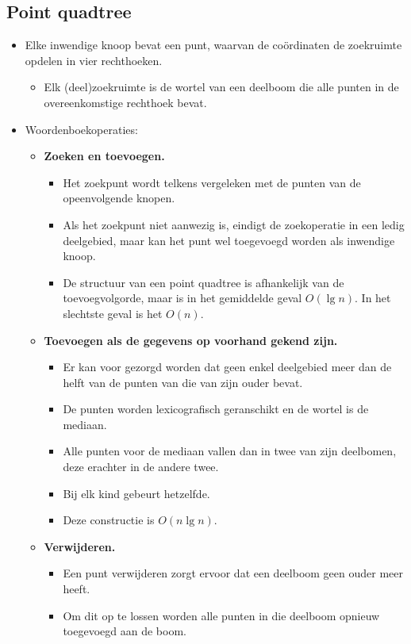 \subsection{Point quadtree}
\begin{itemize}
    \item Elke inwendige knoop bevat een punt, waarvan de coördinaten de zoekruimte opdelen in vier rechthoeken.
    \begin{itemize}
        \item Elk (deel)zoekruimte is de wortel van een deelboom die alle punten in de overeenkomstige rechthoek bevat.
    \end{itemize}
    \item Woordenboekoperaties:
    \begin{itemize}
        \item \textbf{Zoeken en toevoegen.}
        \begin{itemize}
            \item Het zoekpunt wordt telkens vergeleken met de punten van de opeenvolgende knopen.
            \item Als het zoekpunt niet aanwezig is, eindigt de zoekoperatie in een ledig deelgebied, maar kan het punt wel toegevoegd worden als inwendige knoop.
            \item De structuur van een point quadtree is afhankelijk van de toevoegvolgorde, maar is in het gemiddelde geval $O(\lg n)$. In het slechtste geval is het $O(n)$.
        \end{itemize}
        \item \textbf{Toevoegen als de gegevens op voorhand gekend zijn.}
        \begin{itemize}
            \item Er kan voor gezorgd worden dat geen enkel deelgebied meer dan de helft van de punten van die van zijn ouder bevat.
            \item De punten worden lexicografisch geranschikt en de wortel is de mediaan.
            \item Alle punten voor de mediaan vallen dan in twee van zijn deelbomen, deze erachter in de andere twee. 
            \item Bij elk kind gebeurt hetzelfde.
            \item Deze constructie is $O(n\lg n)$. 
        \end{itemize}
        \item \textbf{Verwijderen.}
        \begin{itemize}
            \item Een punt verwijderen zorgt ervoor dat een deelboom geen ouder meer heeft.
            \item Om dit op te lossen worden alle punten in die deelboom opnieuw toegevoegd aan de boom.
        \end{itemize}

    \end{itemize}
\end{itemize}


